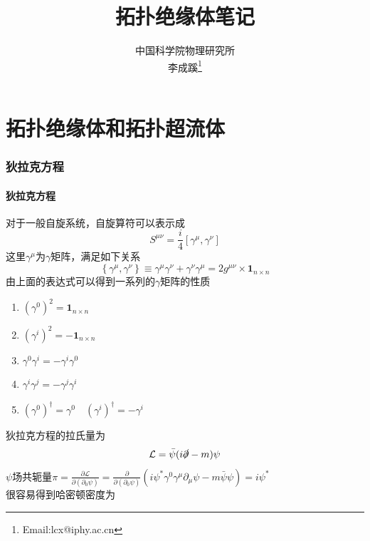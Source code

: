 \documentclass{article}
\numberwithin{equation}{subsection}
\begin{document}
    \title{拓扑绝缘体笔记}
    \author{中国科学院物理研究所\\李成蹊\footnote{Email:lcx@iphy.ac.cn}}
    \maketitle

    \tableofcontents
    \newpage
    \part{拓扑绝缘体和拓扑超流体}
    \section{狄拉克方程}
    \subsection{狄拉克方程}
    对于一般自旋系统，自旋算符可以表示成
    \begin{equation}
        S^{\mu\nu}=\frac{i}{4}[\gamma^\mu,\gamma^\nu]
    \end{equation}
    这里$\gamma^\mu$为$\gamma$矩阵，满足如下关系
    \begin{equation}
        \left\{\gamma^{\mu}, \gamma^{\nu}\right\} \equiv \gamma^{\mu} \gamma^{\nu}+\gamma^{\nu} \gamma^{\mu}=2 g^{\mu \nu} \times \mathbf{1}_{n \times n}
    \end{equation}
    由上面的表达式可以得到一系列的$\gamma$矩阵的性质
    \begin{enumerate}
        \item $(\gamma^0)^2=\mathbf{1}_{n\times n}$
        \item $(\gamma^i)^2=-\mathbf{1}_{n\times n}$
        \item $\gamma^0\gamma^i=-\gamma^i\gamma^0$
        \item $\gamma^i\gamma^j=-\gamma^j\gamma^i$
        \item $(\gamma^0)^\dagger=\gamma^0\quad(\gamma^i)^\dagger=-\gamma^i$
    \end{enumerate}
    狄拉克方程的拉氏量为
    \begin{equation}
        \mathcal{L}=\bar{\psi}(i\slashed\partial-m)\psi
    \end{equation}
    $\psi$场共轭量$\pi=\frac{\partial\mathcal{L}}{\partial(\partial_0\psi)}=\frac{\partial}{\partial(\partial_0\psi)}(i\psi^*\gamma^0\gamma^\mu\partial_\mu\psi-m\bar{\psi}\psi)=i\psi^*$\\
    很容易得到哈密顿密度为
\end{document}

